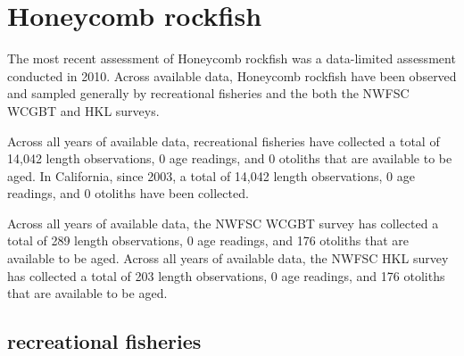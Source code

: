\documentclass[11pt,
  english,
  letterpaper,
]{article}
\begin{document}

\hypertarget{honeycomb-rockfish}{%
\section{Honeycomb rockfish}\label{honeycomb-rockfish}}

\leavevmode\tagmcend\tagstructend


The most recent assessment of Honeycomb rockfish was a data-limited assessment conducted in 2010. Across available data, Honeycomb rockfish have been observed and sampled generally by recreational fisheries and the both the NWFSC WCGBT and HKL surveys.

\leavevmode\tagmcend\tagstructend\par


Across all years of available data, recreational fisheries have collected a total of 14,042 length observations, 0 age readings, and 0 otoliths that are available to be aged. In California, since 2003, a total of 14,042 length observations, 0 age readings, and 0 otoliths have been collected.

\leavevmode\tagmcend\tagstructend\par


Across all years of available data, the NWFSC WCGBT survey has collected a total of 289 length observations, 0 age readings, and 176 otoliths that are available to be aged. Across all years of available data, the NWFSC HKL survey has collected a total of 203 length observations, 0 age readings, and 176 otoliths that are available to be aged.

\leavevmode\tagmcend\tagstructend\par


\hypertarget{recreational-fisheries-17}{%
\subsection{recreational fisheries}\label{recreational-fisheries-17}}

\leavevmode\tagmcend\tagstructend

\end{document}
